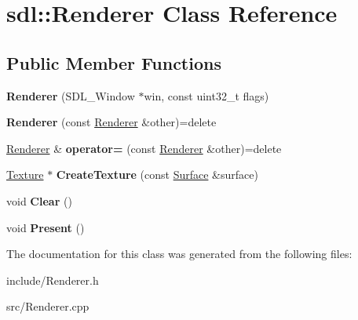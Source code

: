 \hypertarget{classsdl_1_1Renderer}{\section{sdl\-:\-:Renderer Class Reference}
\label{classsdl_1_1Renderer}
}
\subsection*{Public Member Functions}
\begin{DoxyCompactItemize}
\item 
\hypertarget{classsdl_1_1Renderer_ab59359fea7ca532fb77150ddd94b43bb}{{\bfseries Renderer} (S\-D\-L\-\_\-\-Window $\ast$win, const uint32\-\_\-t flags)}\label{classsdl_1_1Renderer_ab59359fea7ca532fb77150ddd94b43bb}

\item 
\hypertarget{classsdl_1_1Renderer_a3ca6bc204c8a7572f94c2f7f217b83c3}{{\bfseries Renderer} (const \hyperlink{classsdl_1_1Renderer}{Renderer} \&other)=delete}\label{classsdl_1_1Renderer_a3ca6bc204c8a7572f94c2f7f217b83c3}

\item 
\hypertarget{classsdl_1_1Renderer_a61c72fdb028a6661dc1af381f00e661e}{\hyperlink{classsdl_1_1Renderer}{Renderer} \& {\bfseries operator=} (const \hyperlink{classsdl_1_1Renderer}{Renderer} \&other)=delete}\label{classsdl_1_1Renderer_a61c72fdb028a6661dc1af381f00e661e}

\item 
\hypertarget{classsdl_1_1Renderer_ae26bde56ec21c25d2902564a222f4cc7}{\hyperlink{classsdl_1_1Texture}{Texture} $\ast$ {\bfseries Create\-Texture} (const \hyperlink{classsdl_1_1Surface}{Surface} \&surface)}\label{classsdl_1_1Renderer_ae26bde56ec21c25d2902564a222f4cc7}

\item 
\hypertarget{classsdl_1_1Renderer_ac70d7505974ea8d7839860d5119a25cf}{void {\bfseries Clear} ()}\label{classsdl_1_1Renderer_ac70d7505974ea8d7839860d5119a25cf}

\item 
\hypertarget{classsdl_1_1Renderer_abbfbe021b0c2da3dc4d3d90eea3f493e}{void {\bfseries Present} ()}\label{classsdl_1_1Renderer_abbfbe021b0c2da3dc4d3d90eea3f493e}

\end{DoxyCompactItemize}


The documentation for this class was generated from the following files\-:\begin{DoxyCompactItemize}
\item 
include/Renderer.\-h\item 
src/Renderer.\-cpp\end{DoxyCompactItemize}
